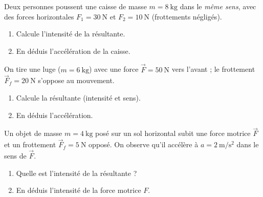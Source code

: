\documentclass[11pt,a4paper]{article}
\newcommand{\vv}[1]{\vec{#1}}\newcommand{\ds}{\displaystyle}
\begin{document}

\begin{exo}
Deux personnes poussent une caisse de masse $m=\qty{8}{\kilogram}$ dans le \emph{même sens}, avec des
forces horizontales $F_1=\qty{30}{\newton}$ et $F_2=\qty{10}{\newton}$ (frottements négligés).
\begin{center}
\end{center}
\begin{enumerate}[label=\alph*)]
  \item Calcule l'intensité de la résultante.
  \item En déduis l'accélération de la caisse.
\end{enumerate}
\end{exo}

\begin{exo}
On tire une luge ($m=\qty{6}{\kilogram}$) avec une force $\vv F=\qty{50}{\newton}$ vers l'avant ;
le frottement $\vv F_f=\qty{20}{\newton}$ s'oppose au mouvement.
\begin{center}
\end{center}
\begin{enumerate}[label=\alph*)]
  \item Calcule la résultante (intensité et sens).
  \item En déduis l'accélération.
\end{enumerate}
\end{exo}

\begin{exo}
Un objet de masse $m=\qty{4}{\kilogram}$ posé sur un sol horizontal subit une force motrice $\vv F$ et
un frottement $\vv F_f=\qty{5}{\newton}$ opposé. On observe qu'il accélère à
$a=\qty{2}{\metre\per\second\squared}$ dans le sens de $\vv F$.
\begin{enumerate}[label=\alph*)]
  \item Quelle est l'intensité de la résultante ?
  \item En déduis l'intensité de la force motrice $F$.
\end{enumerate}
\end{exo}
\end{document}

